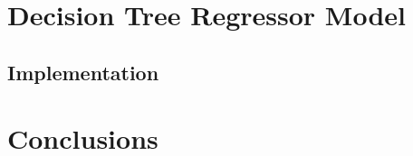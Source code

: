 \documentclass[sigconf,authorversion]{acmart}
\begin{document}
\section{Decision Tree Regressor Model}
\subsection{Implementation}

\section{Conclusions}



\end{document}
